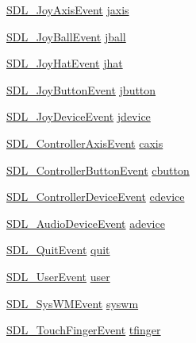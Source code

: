 \begin{DoxyCompactItemize}
\item 
\hyperlink{struct_s_d_l___joy_axis_event}{S\+D\+L\+\_\+\+Joy\+Axis\+Event} \hyperlink{union_s_d_l___event_ac4611acd0e9c675e67dc20919f0accb4}{jaxis}
\item 
\hyperlink{struct_s_d_l___joy_ball_event}{S\+D\+L\+\_\+\+Joy\+Ball\+Event} \hyperlink{union_s_d_l___event_ae433f511e3383d17f8fe02df745ee8f8}{jball}
\item 
\hyperlink{struct_s_d_l___joy_hat_event}{S\+D\+L\+\_\+\+Joy\+Hat\+Event} \hyperlink{union_s_d_l___event_a421b40e0f8e01f181c8d5548cff1dd1d}{jhat}
\item 
\hyperlink{struct_s_d_l___joy_button_event}{S\+D\+L\+\_\+\+Joy\+Button\+Event} \hyperlink{union_s_d_l___event_a591104d64903ae1cf70874fb5d3124ff}{jbutton}
\item 
\hyperlink{struct_s_d_l___joy_device_event}{S\+D\+L\+\_\+\+Joy\+Device\+Event} \hyperlink{union_s_d_l___event_a17514dc19a846ea1b5fbe44123700c4c}{jdevice}
\item 
\hyperlink{struct_s_d_l___controller_axis_event}{S\+D\+L\+\_\+\+Controller\+Axis\+Event} \hyperlink{union_s_d_l___event_aa8f6df0f2716fae56204b12ab4a4c289}{caxis}
\item 
\hyperlink{struct_s_d_l___controller_button_event}{S\+D\+L\+\_\+\+Controller\+Button\+Event} \hyperlink{union_s_d_l___event_aee2b5671c8dcdb447023715cc21593cb}{cbutton}
\item 
\hyperlink{struct_s_d_l___controller_device_event}{S\+D\+L\+\_\+\+Controller\+Device\+Event} \hyperlink{union_s_d_l___event_ad3beed01e690b885728e0b0e1d636378}{cdevice}
\item 
\hyperlink{struct_s_d_l___audio_device_event}{S\+D\+L\+\_\+\+Audio\+Device\+Event} \hyperlink{union_s_d_l___event_a111e01fcac4fd8e251a6058ff9f17e72}{adevice}
\item 
\hyperlink{struct_s_d_l___quit_event}{S\+D\+L\+\_\+\+Quit\+Event} \hyperlink{union_s_d_l___event_a102a3008afe67a1c02ae7504e232dcef}{quit}
\item 
\hyperlink{struct_s_d_l___user_event}{S\+D\+L\+\_\+\+User\+Event} \hyperlink{union_s_d_l___event_ab7c394e3ce7bf1e4f8d68bc0e9f1b042}{user}
\item 
\hyperlink{struct_s_d_l___sys_w_m_event}{S\+D\+L\+\_\+\+Sys\+W\+M\+Event} \hyperlink{union_s_d_l___event_ab3b2eaf5348d4c50a51b1f297fdef537}{syswm}
\item 
\hyperlink{struct_s_d_l___touch_finger_event}{S\+D\+L\+\_\+\+Touch\+Finger\+Event} \hyperlink{union_s_d_l___event_ab18d7d60794cb056948ffa58541bc3c5}{tfinger}
\item 

\end{DoxyCompactItemize}

